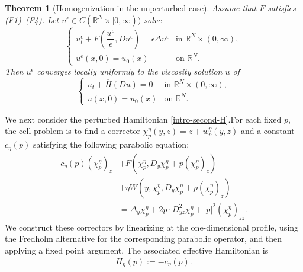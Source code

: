 \documentclass[preprint]{elsarticle}
\newtheorem{result}{\textbf{Theorem}}
\numberwithin{equation}{section}
\begin{document}
\begin{result}[Homogenization in the unperturbed case]
Assume that $F$ satisfies \textup{(F1)}--\textup{(F4)}. Let $u^\epsilon \in C(\mathbb R^N\times [0,\infty))$ solve
\begin{equation}
\begin{cases}
u_t^\epsilon+F\left(\dfrac{u^\epsilon}{\epsilon},Du^\epsilon\right)=\epsilon\Delta u^\epsilon
&\text{in }\mathbb R^N\times(0,\infty),
\\[2mm]
u^\epsilon(x,0)=u_0(x)
&\text{on }\mathbb R^N.
\end{cases}
\end{equation}
Then $u^\epsilon$ converges locally uniformly to the viscosity solution $u$ of
\begin{equation}
\begin{cases}
u_t+\overline H(Du)=0
&\text{in }\mathbb R^N\times(0,\infty),
\\
u(x,0)=u_0(x)
&\text{on }\mathbb R^N.
\end{cases}
\end{equation}
\end{result}

We next consider the perturbed Hamiltonian \eqref{intro-second-H}.For each fixed $p$, the cell problem is to find a corrector $\chi_p^\eta(y,z)=z+w_p^\eta(y,z)$ and a constant $c_\eta(p)$ satisfying the following parabolic equation:
\begin{equation*}
\begin{aligned}
c_\eta(p)(\chi_p^\eta)_z
&+
F\left(\chi_p^\eta,D_y\chi_p^\eta+p(\chi_p^\eta)_z\right)
\\
&+
\eta W\left(y,\chi_p^\eta,D_y\chi_p^\eta+p(\chi_p^\eta)_z\right)
\\
&=
\Delta_y\chi_p^\eta
+
2p\cdot D^2_{yz}\chi_p^\eta
+
|p|^2(\chi_p^\eta)_{zz}.
\end{aligned}
\end{equation*}
We construct these correctors by linearizing at the one-dimensional profile, using the Fredholm alternative for the corresponding parabolic operator, and then applying a fixed point argument. The associated effective Hamiltonian is
\begin{equation*}
\overline H_\eta(p):=-c_\eta(p).
\end{equation*}
\end{document}

